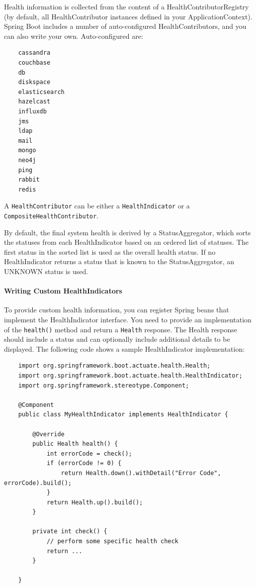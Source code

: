 \documentclass{scrartcl}
\begin{document}
Health information is collected from the content of a HealthContributorRegistry (by default, all HealthContributor instances defined in your ApplicationContext). Spring Boot includes a number of auto-configured HealthContributors, and you can also write your own. Auto-configured are:

\begin{lstlisting}
    cassandra
    couchbase
    db
    diskspace
    elasticsearch
    hazelcast
    influxdb
    jms
    ldap
    mail
    mongo
    neo4j
    ping
    rabbit
    redis
\end{lstlisting}

A \lstinline|HealthContributor| can be either a \lstinline|HealthIndicator| or a \lstinline|CompositeHealthContributor|.

By default, the final system health is derived by a StatusAggregator, which sorts the statuses from each HealthIndicator based on an ordered list of statuses. The first status in the sorted list is used as the overall health status. If no HealthIndicator returns a status that is known to the StatusAggregator, an UNKNOWN status is used.

\paragraph{Writing Custom HealthIndicators}

To provide custom health information, you can register Spring beans that implement the HealthIndicator interface. You need to provide an implementation of the \lstinline|health()| method and return a \lstinline|Health| response. The Health response should include a status and can optionally include additional details to be displayed. The following code shows a sample HealthIndicator implementation:

    \begin{lstlisting}
    import org.springframework.boot.actuate.health.Health;
    import org.springframework.boot.actuate.health.HealthIndicator;
    import org.springframework.stereotype.Component;

    @Component
    public class MyHealthIndicator implements HealthIndicator {

        @Override
        public Health health() {
            int errorCode = check();
            if (errorCode != 0) {
                return Health.down().withDetail("Error Code", errorCode).build();
            }
            return Health.up().build();
        }

        private int check() {
            // perform some specific health check
            return ...
        }

    }
    \end{lstlisting}
\end{document}
